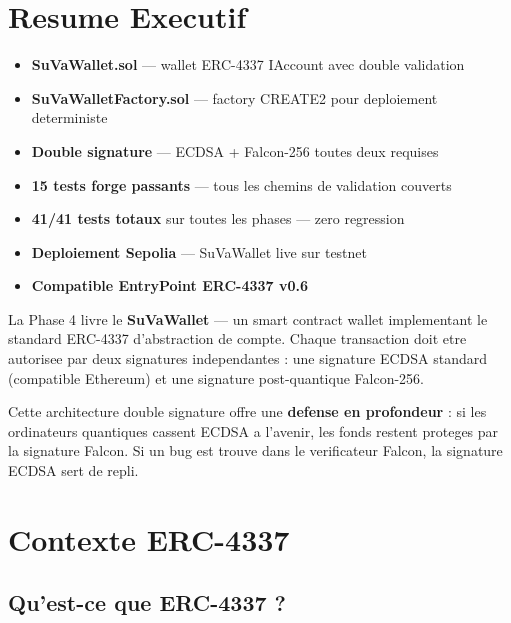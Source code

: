 \documentclass[11pt,a4paper]{article}
\begin{document}
\section{Resume Executif}

\begin{resultbox}
\begin{itemize}
  \item[$\checkmark$] \textbf{SuVaWallet.sol} --- wallet ERC-4337 IAccount avec double validation
  \item[$\checkmark$] \textbf{SuVaWalletFactory.sol} --- factory CREATE2 pour deploiement deterministe
  \item[$\checkmark$] \textbf{Double signature} --- ECDSA + Falcon-256 toutes deux requises
  \item[$\checkmark$] \textbf{15 tests forge passants} --- tous les chemins de validation couverts
  \item[$\checkmark$] \textbf{41/41 tests totaux} sur toutes les phases --- zero regression
  \item[$\checkmark$] \textbf{Deploiement Sepolia} --- SuVaWallet live sur testnet
  \item[$\checkmark$] \textbf{Compatible EntryPoint ERC-4337 v0.6}
\end{itemize}
\end{resultbox}

\vspace{0.5cm}

La Phase 4 livre le \textbf{SuVaWallet} --- un smart contract wallet implementant le standard
ERC-4337 d'abstraction de compte. Chaque transaction doit etre autorisee par deux signatures
independantes : une signature ECDSA standard (compatible Ethereum) et une signature post-quantique
Falcon-256.

Cette architecture double signature offre une \textbf{defense en profondeur} : si les ordinateurs
quantiques cassent ECDSA a l'avenir, les fonds restent proteges par la signature Falcon. Si un bug
est trouve dans le verificateur Falcon, la signature ECDSA sert de repli.

\section{Contexte ERC-4337}

\subsection{Qu'est-ce que ERC-4337 ?}
\end{document}

